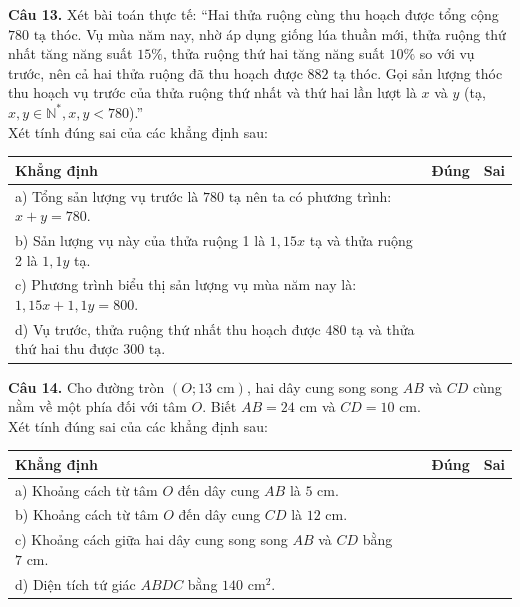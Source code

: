 \documentclass[11pt,a4paper]{article}
\begin{document}
\vspace{1.5mm}
\textbf{Câu 13.} Xét bài toán thực tế: ``Hai thửa ruộng cùng thu hoạch được tổng cộng $780\text{ tạ}$ thóc. Vụ mùa năm nay, nhờ áp dụng giống lúa thuần mới, thửa ruộng thứ nhất tăng năng suất $15\%$, thửa ruộng thứ hai tăng năng suất $10\%$ so với vụ trước, nên cả hai thửa ruộng đã thu hoạch được $882\text{ tạ}$ thóc. Gọi sản lượng thóc thu hoạch vụ trước của thửa ruộng thứ nhất và thứ hai lần lượt là $x$ và $y$ (tạ, $x, y \in \mathbb{N}^*, x, y < 780$).''\\
Xét tính đúng sai của các khẳng định sau:
\begin{center}
\begin{tabularx}{\linewidth}{|X|c|c|}
\hline
\textbf{Khẳng định} & \textbf{Đúng} & \textbf{Sai} \\
\hline
a) Tổng sản lượng vụ trước là $780\text{ tạ}$ nên ta có phương trình: $x + y = 780$. & & \\
\hline
b) Sản lượng vụ này của thửa ruộng 1 là $1{,}15x$ tạ và thửa ruộng 2 là $1{,}1y$ tạ. & & \\
\hline
c) Phương trình biểu thị sản lượng vụ mùa năm nay là: $1{,}15x + 1{,}1y = 800$. & & \\
\hline
d) Vụ trước, thửa ruộng thứ nhất thu hoạch được $480\text{ tạ}$ và thửa thứ hai thu được $300\text{ tạ}$. & & \\
\hline
\end{tabularx}
\end{center}

\vspace{2mm}
\textbf{Câu 14.} Cho đường tròn $(O; 13\text{ cm})$, hai dây cung song song $AB$ và $CD$ cùng nằm về một phía đối với tâm $O$. Biết $AB = 24\text{ cm}$ và $CD = 10\text{ cm}$.\\
Xét tính đúng sai của các khẳng định sau:
\begin{center}
\begin{tabularx}{\linewidth}{|X|c|c|}
\hline
\textbf{Khẳng định} & \textbf{Đúng} & \textbf{Sai} \\
\hline
a) Khoảng cách từ tâm $O$ đến dây cung $AB$ là $5\text{ cm}$. & & \\
\hline
b) Khoảng cách từ tâm $O$ đến dây cung $CD$ là $12\text{ cm}$. & & \\
\hline
c) Khoảng cách giữa hai dây cung song song $AB$ và $CD$ bằng $7\text{ cm}$. & & \\
\hline
d) Diện tích tứ giác $ABDC$ bằng $140\text{ cm}^2$. & & \\
\hline
\end{tabularx}
\end{center}
\end{document}
